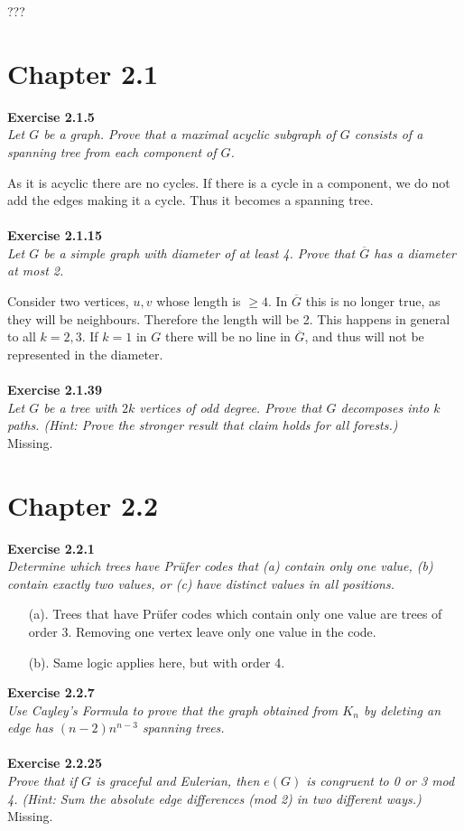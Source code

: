 ???



\section{Chapter 2.1}
\noindent
\textbf{Exercise 2.1.5}\\
\noindent
\textit{Let $G$ be a graph. Prove that a maximal acyclic subgraph of $G$ consists of a spanning tree from each component of $G$.}

As it is acyclic there are no cycles. If there is a cycle in a component, we do not add the edges making it a cycle. Thus it becomes a spanning tree.
\\\\
\noindent
\textbf{Exercise 2.1.15}\\
\noindent
\textit{Let $G$ be a simple graph with diameter of at least 4. Prove that $\overline{G}$ has a diameter at most 2.}

Consider two vertices, $u, v$ whose length is $\ge 4$. In $\overline{G}$ this is no longer true, as they will be neighbours. Therefore the length will be 2. This happens in general to all $k = 2, 3$. If $k = 1$ in $G$ there will be no line in $\overline{G}$, and thus will not be represented in the diameter.
\\\\
\noindent
\textbf{Exercise 2.1.39}\\
\noindent
\textit{Let $G$ be a tree with $2k$ vertices of odd degree. Prove that $G$ decomposes into $k$ paths. (Hint: Prove the stronger result that claim holds for all forests.)}\\
Missing.
\section{Chapter 2.2}
\noindent
\textbf{Exercise 2.2.1}\\
\noindent
\textit{Determine which trees have Prüfer codes that (a) contain only one value, (b) contain exactly two values, or (c) have distinct values in all positions.}\\

\begin{enumerate}
	\item[(a).] Trees that have Prüfer codes which contain only one value are trees of order 3. Removing one vertex leave only one value in the code.
	\item[(b).] Same logic applies here, but with order 4.
\end{enumerate}
\noindent
\textbf{Exercise 2.2.7}\\
\noindent
\textit{Use Cayley's Formula to prove that the graph obtained from $K_{n}$ by deleting an edge has $(n-2)n^{n-3}$ spanning trees.}
\\\\
\noindent
\textbf{Exercise 2.2.25}\\
\noindent
\textit{Prove that if $G$ is graceful and Eulerian, then $e(G)$ is congruent to 0 or 3 mod 4. (Hint: Sum the absolute edge differences (mod 2) in two different ways.)}\\
Missing.

